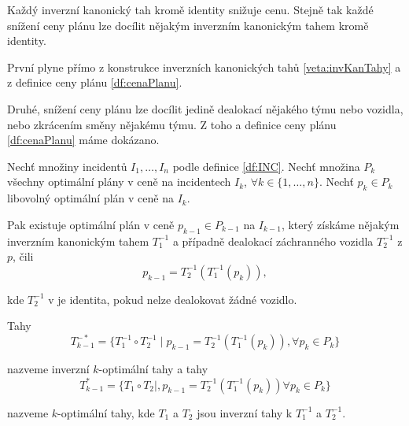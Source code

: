 \begin{veta}\label{veta:kazdyInvSnizujeCenu}
  Každý inverzní kanonický tah kromě identity snižuje cenu.
  Stejně tak každé snížení ceny plánu lze docílit nějakým inverzním kanonickým tahem kromě identity.
\end{veta}
\begin{dukaz}
  První plyne přímo z konstrukce inverzních kanonických tahů \ref{veta:invKanTahy} a z definice ceny plánu \ref{df:cenaPlanu}.

  Druhé, snížení ceny plánu lze docílit jedině dealokací nějakého týmu nebo vozidla, nebo zkrácením směny nějakému týmu.
  Z toho a definice ceny plánu \ref{df:cenaPlanu} máme dokázano.
\end{dukaz}

\begin{veta}\label{veta:vztahOptim}
  Nechť množiny incidentů $I_1, \dots, I_n$ podle definice \ref{df:INC}.
  Nechť množina $P_{k}$ všechny optimální plány v ceně na incidentech $I_k$, $\forall k \in \{ 1, \dots, n \}$.
  Nechť $p_k \in P_k$ libovolný optimální plán v ceně na $I_k$.

  Pak existuje optimální plán v ceně $p_{k-1} \in P_{k-1}$ na $I_{k-1}$, který získáme nějakým inverzním kanonickým tahem $T^{-1}_1$ a případně dealokací záchranného vozidla $T^{-1}_2$ z $p$,
  čili
  \begin{equation*}
    p_{k-1} = T^{-1}_2(T^{-1}_1(p_k)),
  \end{equation*}

  kde $T^{-1}_2$ v je identita, pokud nelze dealokovat žádné vozidlo.

  Tahy 
  \begin{equation*}
    T^{-*}_{k-1} = \{ T^{-1}_1 \circ T^{-1}_2 \mid p_{k-1} = T^{-1}_2(T^{-1}_1(p_k)), \forall p_k \in P_k \}
  \end{equation*}

  nazveme inverzní $k$-optimální tahy a tahy
  \begin{equation*}
    T^{*}_{k-1} = \{ T_1 \circ T_2 \mid , p_{k-1} = T^{-1}_2(T^{-1}_1(p_k)) \forall p_k \in P_k \}
  \end{equation*}

  nazveme $k$-optimální tahy, kde $T_1$ a $T_2$ jsou inverzní tahy k $T^{-1}_1$ a $T^{-1}_2$.

\end{veta}
